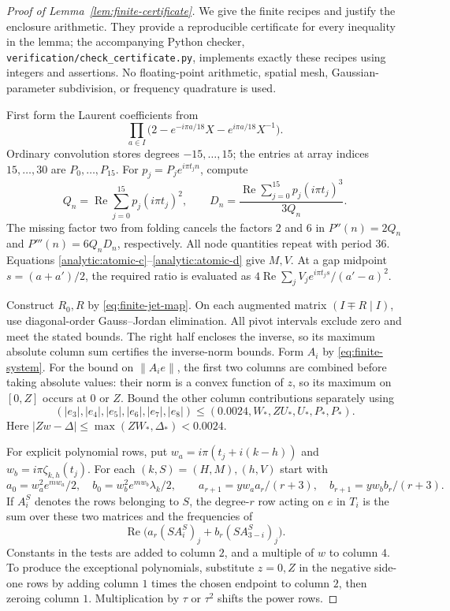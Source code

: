 \documentclass[11pt]{article}
\theoremstyle{remark}\newtheorem{remark}[theorem]{Remark}
\begin{document}
\begin{proof}[Proof of Lemma~\ref{lem:finite-certificate}]
We give the finite recipes and justify the enclosure arithmetic. They
provide a reproducible certificate for every inequality in the lemma;
the accompanying Python checker, \texttt{verification/check\_certificate.py},
implements exactly these recipes using
integers and assertions. No floating-point arithmetic, spatial mesh,
Gaussian-parameter subdivision, or frequency quadrature is used.

First form the Laurent coefficients from
\[
 \prod_{a\in I}\bigl(2-e^{-i\pi a/18}X-e^{i\pi a/18}X^{-1}\bigr).
\]
Ordinary convolution stores degrees $-15,\ldots,15$; the entries at
array indices $15,\ldots,30$ are $P_0,\ldots,P_{15}$.
For $p_j=P_je^{i\pi t_jn}$, compute
\[
 Q_n=\operatorname{Re}\sum_{j=0}^{15}p_j(i\pi t_j)^2,
 \qquad
 D_n=\frac{\operatorname{Re}\sum_{j=0}^{15}p_j(i\pi t_j)^3}{3Q_n}.
\]
The missing factor two from folding cancels the factors $2$ and $6$
in $P''(n)=2Q_n$ and $P'''(n)=6Q_nD_n$, respectively. All node
quantities repeat with period $36$. Equations \eqref{analytic:atomic-c}--\eqref{analytic:atomic-d}
give $M,V$.
At a gap midpoint $s=(a+a')/2$, the required ratio is evaluated as
$4\operatorname{Re}\sum_jV_je^{i\pi t_js}/(a'-a)^2$.

Construct $R_0,R$ by \eqref{eq:finite-jet-map}. On each augmented
matrix $(I\mp R\mid I)$, use diagonal-order Gauss--Jordan elimination.
All pivot intervals exclude zero and meet the stated bounds. The right
half encloses the inverse, so its maximum absolute column sum certifies
the inverse-norm bounds. Form $A_i$ by \eqref{eq:finite-system}.
For the bound on $\|A_ie\|$, the first two columns are combined before
taking absolute values: their norm is a convex function of $z$, so its
maximum on $[0,Z]$ occurs at $0$ or $Z$. Bound the other column
contributions separately using
\[
 (|e_3|,|e_4|,|e_5|,|e_6|,|e_7|,|e_8|)
 \leq(0.0024,W_*,ZU_*,U_*,P_*,P_*).
\]
Here $|Zw-\Delta|\leq\max(ZW_*,\Delta_*)<0.0024$.

For explicit polynomial rows, put
$w_a=i\pi(t_j+i(k-h))$ and $w_b=i\pi\zeta_{k,h}(t_j)$.
For each $(k,S)=(H,M),(h,V)$ start with
\[
 a_0=w_a^2e^{mw_a}/2,\quad
 b_0=w_b^2e^{mw_b}\lambda_k/2,
 \qquad
 a_{r+1}=yw_aa_r/(r+3),\quad b_{r+1}=yw_bb_r/(r+3).
\]
If $A_i^S$ denotes the rows belonging to $S$, the degree-$r$ row
acting on $e$ in $T_i$ is the sum over these two matrices and the
frequencies of
\[
 \operatorname{Re}\bigl(a_r(SA_i^S)_j+b_r(SA_{3-i}^S)_j\bigr).
\]
Constants in the tests are added to column $2$, and a multiple of $w$
to column $4$. To produce the exceptional polynomials, substitute
$z=0,Z$ in the negative side-one rows by adding column $1$ times the
chosen endpoint to column $2$, then zeroing column $1$. Multiplication
by $\tau$ or $\tau^2$ shifts the power rows.


\end{proof}
\end{document}
